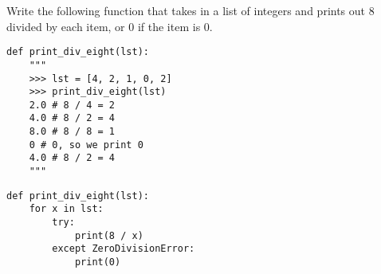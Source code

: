 \begin{blocksection}
\question Write the following function that takes in a list of integers and prints out 8 divided by each item, or 0 if the item is 0.

\begin{lstlisting}
def print_div_eight(lst):
    """
    >>> lst = [4, 2, 1, 0, 2]
    >>> print_div_eight(lst)
    2.0 # 8 / 4 = 2
    4.0 # 8 / 2 = 4
    8.0 # 8 / 8 = 1
    0 # 0, so we print 0
    4.0 # 8 / 2 = 4
    """
\end{lstlisting}



\vspace{2in}



\begin{solution}[1in]
\begin{lstlisting}
def print_div_eight(lst):
    for x in lst:
    	try:
    		print(8 / x)
    	except ZeroDivisionError:
    		print(0)
\end{lstlisting}
\end{solution}
\end{blocksection}